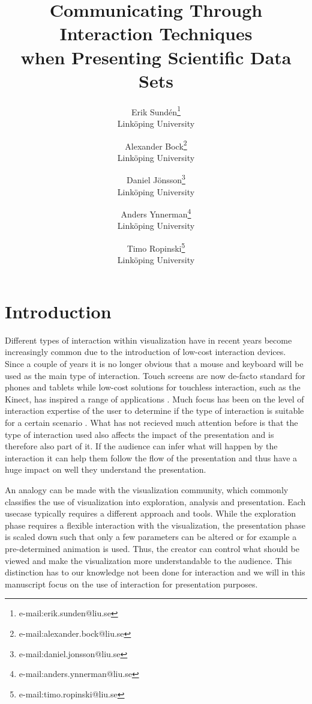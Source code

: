 \documentclass[review,journal]{vgtc}         %
\title{Communicating Through Interaction Techniques\\when Presenting Scientific Data Sets} %
\author{Erik Sund\'en\thanks{e-mail:erik.sunden@liu.se}\\ %
        \scriptsize Link{\"o}ping University %
\and Alexander Bock\thanks{e-mail:alexander.bock@liu.se}\\ %
			   \scriptsize Link{\"o}ping University %
\and Daniel J\"onsson\thanks{e-mail:daniel.jonsson@liu.se}\\ %
          \scriptsize Link{\"o}ping University %
\and Anders Ynnerman\thanks{e-mail:anders.ynnerman@liu.se}\\ %
          \scriptsize Link{\"o}ping University %
\and Timo Ropinski\thanks{e-mail:timo.ropinski@liu.se}\\ %
           \scriptsize Link{\"o}ping University }
\begin{document}

\maketitle

\section{Introduction}\label{sec:introduction}
Different types of interaction within visualization have in recent years become increasingly common due to the introduction of low-cost interaction devices.
Since a couple of years it is no longer obvious that a mouse and keyboard will be used as the main type of interaction. 
Touch screens are now de-facto standard for phones and tablets while low-cost solutions for touchless interaction, such as the Kinect, has inspired a range of applications \cite{zora82163, OHaraGSPVMCCRDC14}.
Much focus has been on the level of interaction expertise of the user to determine if the type of interaction is suitable for a certain scenario \cite{DBLP:journals/tvcg/YiKSJ07}. What has not recieved much attention before is that the type of interaction used also affects the impact of the presentation and is therefore also part of it. If the audience can infer what will happen by the interaction it can help them follow the flow of the presentation and thus have a huge impact on well they understand the presentation.

An analogy can be made with the visualization community, which commonly classifies the use of visualization into exploration, analysis and presentation. Each usecase typically requires a different approach and tools. 
While the exploration phase requires a flexible interaction with the visualization, the presentation phase is scaled down such that only a few parameters can be altered or for example a pre-determined animation is used. Thus, the creator can control what should be viewed and make the visualization more understandable to the audience.
This distinction has to our knowledge not been done for interaction and we will in this manuscript focus on the use of interaction for presentation purposes.
\end{document}
